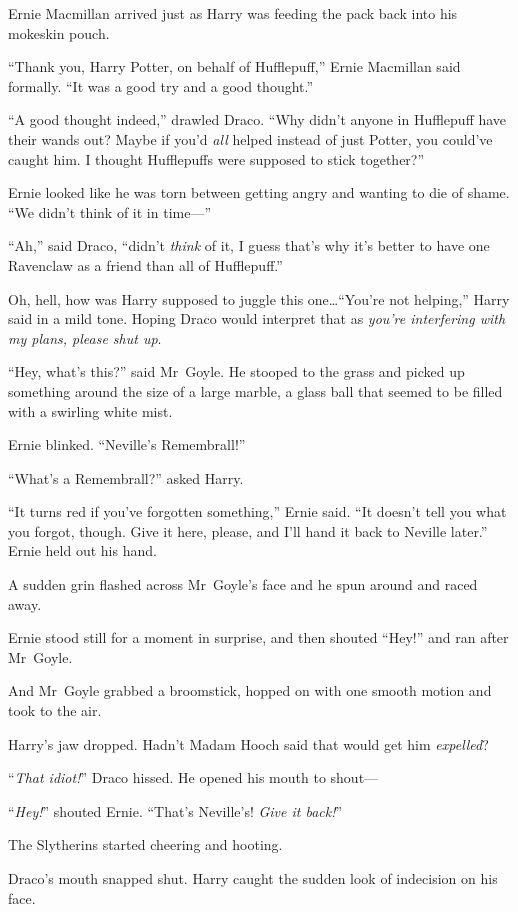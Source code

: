 Ernie Macmillan arrived just as Harry was feeding the pack back into his mokeskin pouch.

“Thank you, Harry Potter, on behalf of Hufflepuff,” Ernie Macmillan said formally.
“It was a good try and a good thought.”

“A good thought indeed,” drawled Draco.
“Why didn’t anyone in Hufflepuff have their wands out? Maybe if you’d \emph{all} helped instead of just Potter, you could’ve caught him. I thought Hufflepuffs were supposed to stick together?”

Ernie looked like he was torn between getting angry and wanting to die of shame.
“We didn’t think of it in time—”

“Ah,” said Draco, “didn’t \emph{think} of it, I guess that’s why it’s better to have one Ravenclaw as a friend than all of Hufflepuff.”

Oh, hell, how was Harry supposed to juggle this one…“You’re not helping,” Harry said in a mild tone. Hoping Draco would interpret that as \emph{you’re interfering with my plans, please shut up}.

“Hey, what’s this?” said Mr~Goyle. He stooped to the grass and picked up something around the size of a large marble, a glass ball that seemed to be filled with a swirling white mist.

Ernie blinked.
“Neville’s Remembrall!”

“What’s a Remembrall?” asked Harry.

“It turns red if you’ve forgotten something,” Ernie said.
“It doesn’t tell you what you forgot, though. Give it here, please, and I’ll hand it back to Neville later.” Ernie held out his hand.

A sudden grin flashed across Mr~Goyle’s face and he spun around and raced away.

Ernie stood still for a moment in surprise, and then shouted
“Hey!” and ran after Mr~Goyle.

And Mr~Goyle grabbed a broomstick, hopped on with one smooth motion and took to the air.

Harry’s jaw dropped. Hadn’t Madam Hooch said that would get him \emph{expelled}?

“\emph{That idiot!}” Draco hissed. He opened his mouth to shout—

“\emph{Hey!}” shouted Ernie.
“That’s Neville’s! \emph{Give it back!}”

The Slytherins started cheering and hooting.

Draco’s mouth snapped shut. Harry caught the sudden look of indecision on his face.

